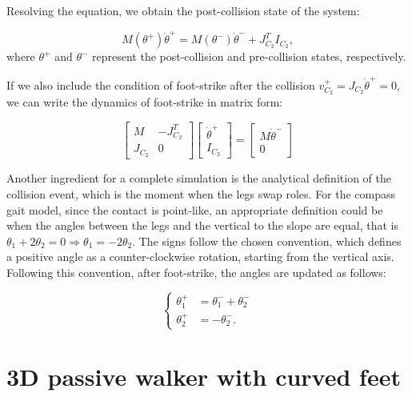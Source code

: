 Resolving the equation, we obtain the post-collision state of the system:

\begin{equation}
    M(\theta^+)\dot{\theta}^+ = M(\theta^-)\dot{\theta}^- + J_{C_2}^T I_{C_2},
\end{equation}
where $\theta^+$ and $\theta^-$ represent the post-collision and pre-collision states, respectively.

If we also include the condition of foot-strike after the collision $v_{C_2}^{+} = J_{C_2}\dot{\theta}^+ = 0$, we can write the dynamics of foot-strike in matrix form:

\begin{equation}\label{eq:compass_gait_footstrike_matrix}
    \begin{bmatrix}
        M & -J_{C_2}^T\\
        J_{C_2} & 0
    \end{bmatrix}
    \begin{bmatrix}
        \dot{\theta}^+\\
        I_{C_2}
    \end{bmatrix} = 
    \begin{bmatrix}
        M\dot{\theta}^-\\
        0
    \end{bmatrix}
\end{equation}

Another ingredient for a complete simulation is the analytical definition of the collision event, which is the moment when the legs swap roles.
For the compass gait model, since the contact is point-like, an appropriate definition could be when the angles between the legs and the vertical to the slope are equal, that is $\theta_1 + 2\theta_2 = 0 \Longrightarrow \theta_1 = -2\theta_2$.
The signs follow the chosen convention, which defines a positive angle as a counter-clockwise rotation, starting from the vertical axis.
Following this convention, after foot-strike, the angles are updated as follows:

\begin{equation}
    \begin{cases}
        \theta_1^+ &= \theta_1^- + \theta_2^-\\
        \theta_2^+ &= -\theta_2^-.
    \end{cases}
\end{equation}


\section{3D passive walker with curved feet}
